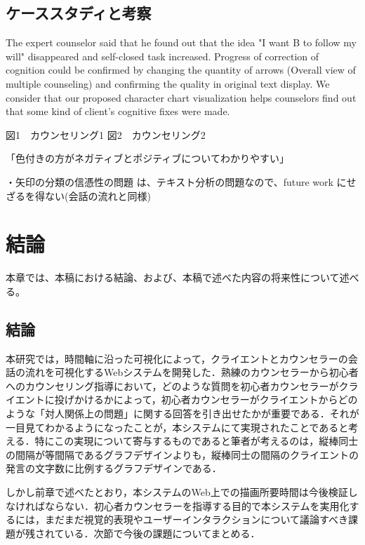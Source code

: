 \documentclass[shuuron]{kuee}
\begin{document}
\section{ケーススタディと考察}

  The expert counselor said that he found out that the idea "I want B to follow my will" disappeared and self-closed task increased. Progress of correction of cognition could be confirmed by changing the quantity of arrows (Overall view of multiple counseling) and confirming the quality in original text display. We consider that our proposed character chart visualization helps counselors find out that some kind of client's cognitive fixes were made.

  図1　カウンセリング1
  図2　カウンセリング2

  「色付きの方がネガティブとポジティブについてわかりやすい」

・矢印の分類の信憑性の問題
は、テキスト分析の問題なので、future work にせざるを得ない(会話の流れと同様)

\chapter{結論}

本章では、本稿における結論、および、本稿で述べた内容の将来性について述べる。

\section{結論}

本研究では，時間軸に沿った可視化によって，クライエントとカウンセラーの会話の流れを可視化するWebシステムを開発した．熟練のカウンセラーから初心者へのカウンセリング指導において，どのような質問を初心者カウンセラーがクライエントに投げかけるかによって，初心者カウンセラーがクライエントからどのような「対人関係上の問題」に関する回答を引き出せたかが重要である．それが一目見てわかるようになったことが，本システムにて実現されたことであると考える．特にこの実現について寄与するものであると筆者が考えるのは，縦棒同士の間隔が等間隔であるグラフデザインよりも，縦棒同士の間隔のクライエントの発言の文字数に比例するグラフデザインである．

しかし前章で述べたとおり，本システムのWeb上での描画所要時間は今後検証しなければならない．初心者カウンセラーを指導する目的で本システムを実用化するには，まだまだ視覚的表現やユーザーインタラクションについて議論すべき課題が残されている．次節で今後の課題についてまとめる．


\end{document}
